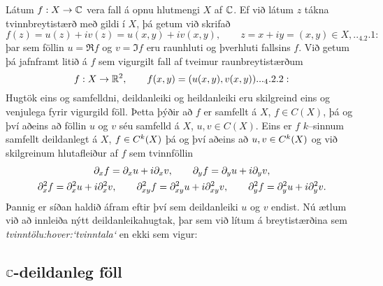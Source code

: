 \noindent
Látum $f:X\to {\mathbb C}$ vera fall á opnu hlutmengi $X$ af ${\mathbb C}$.  
Ef við látum $z$ tákna tvinnbreytistærð með gildi í $X$, þá getum við
skrifað 
 \begin{equation*}f(z)=u(z)+iv(z)=u(x,y)+iv(x,y), \qquad z=x+iy=(x,y) \in X,


.. _4.2.1:

 \end{equation*}
þar sem föllin $u=\Re f$ og $v=\Im f$ eru raunhluti og þverhluti
fallsins $f$.
Við getum þá jafnframt litið á $f$ sem vigurgilt fall
af tveimur raunbreytistærðum
 \begin{equation*}f:X\to \R\sp 2, \qquad f(x,y)=(u(x,y), v(x,y)).


.. _4.2.2:

 \end{equation*}
Hugtök eins og samfelldni, deildanleiki og heildanleiki  eru
skilgreind eins og venjulega fyrir vigurgild föll.  Þetta þýðir að
$f$ er samfellt á $X$, $f\in C(X)$, þá og því aðeins að föllin $u$ og
$v$ séu samfelld á $X$, $u,v\in C(X)$.  Eins er $f$ $k$--sinnum
samfellt deildanlegt á $X$, $f\in C\sp k(X)$ þá og því aðeins að
$u,v\in C\sp k(X)$  og við skilgreinum hlutafleiður af $f$ sem tvinnföllin
\begin{gather*}
\partial_xf=\partial_xu+i\partial_xv, \qquad
\partial_yf=\partial_yu+i\partial_yv,\\
\partial\sp 2_xf=\partial\sp 2_xu+i\partial\sp 2_xv, \qquad
\partial\sp 2_{xy}f=\partial\sp 2_{xy}u+i\partial\sp 2_{xy}v,\qquad
\partial\sp 2_yf=\partial\sp 2_yu+i\partial\sp 2_yv.
\end{gather*}
Þannig er síðan haldið áfram eftir því sem deildanleiki $u$ og $v$
endist.  Nú ætlum við að innleiða nýtt deildanleikahugtak, þar sem
við lítum á breytistærðina sem {\it tvinntölu:hover:`tvinntala`} en ekki sem vigur:

\subsection*{${\mathbb C}$-deildanleg föll}

